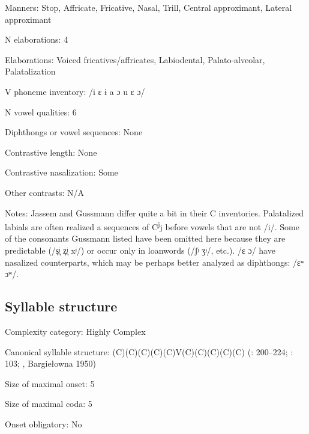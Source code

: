 {\begin{appendixdesc}
\item[Manners:] Stop, Affricate, Fricative, Nasal, Trill, Central approximant, Lateral approximant

\item[N elaborations:] 4

\item[Elaborations:] Voiced fricatives/affricates, Labiodental, Palato-alveolar, Palatalization

\item[V phoneme inventory:] /i ɛ ɨ a ɔ u ɛ ɔ/

\item[N vowel qualities:] 6

\item[Diphthongs or vowel sequences:] None

\item[Contrastive length:] None

\item[Contrastive nasalization:] Some

\item[Other contrasts:] N/A

\item[Notes:] Jassem and Gussmann differ quite a bit in their C inventories. Palatalized labials are often realized a sequences of C\textsuperscript{j}j before vowels that are not /i/. Some of the consonants Gussmann listed have been omitted here because they are predictable (/s̪ʲ z̪ʲ xʲ/) or occur only in loanwords (/ʃʲ ʒʲ/, etc.). /ɛ ɔ/ have nasalized counterparts, which may be perhaps better analyzed as diphthongs: /ɛʷ ɔʷ/.
\end{appendixdesc}
\subsection*{Syllable structure}
\begin{appendixdesc}

\item[Complexity category:] Highly Complex

\item[Canonical syllable structure:] (C)(C)(C)(C)(C)V(C)(C)(C)(C)(C) (\citealt{Gussmann2007}: 200--224; \citealt{Jassem2003}: 103; \citealt{Zydorowicz2010}, Bargiełowna 1950)

\item[Size of maximal onset:] 5

\item[Size of maximal coda:] 5

\item[Onset obligatory:] No


\end{appendixdesc}}
